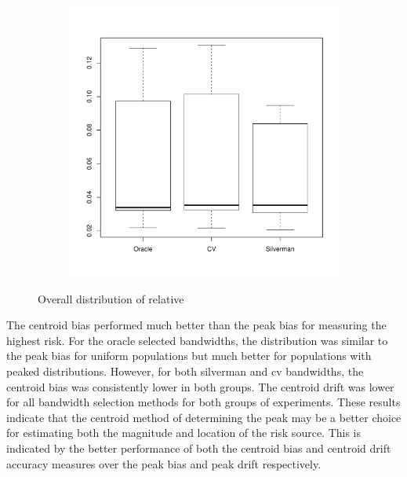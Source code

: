\begin{figure}[htbp]
\begin{subfigure}[t]{0.45\textwidth}
        \includegraphics[width=\textwidth]{results/by_overall/relative-centroid-drift-peakpop-boxplot}
        \label{fig:discussion:overall_centroiddrift_boxplot:peak}
    \end{subfigure}
    \caption{Overall distribution of relative }
    \label{fig:discussion:overall_centroiddrift_boxplot}
\end{figure}

The \gls{centroid bias} performed much better than the \gls{peak bias} for measuring the highest risk.
For the \gls{oracle} selected bandwidths, the distribution was similar to the \gls{peak bias} for uniform populations but much better for populations with peaked distributions.
However, for both \gls{silverman} and \gls{cv} bandwidths, the \gls{centroid bias} was consistently lower in both groups.
The \gls{centroid drift} was lower for all bandwidth selection methods for both groups of experiments.
These results indicate that the centroid method of determining the peak may be a better choice for estimating both the magnitude and location of the risk source.
This is indicated by the better performance of both the \gls{centroid bias} and \gls{centroid drift} accuracy measures over the \gls{peak bias} and \gls{peak drift} respectively.

